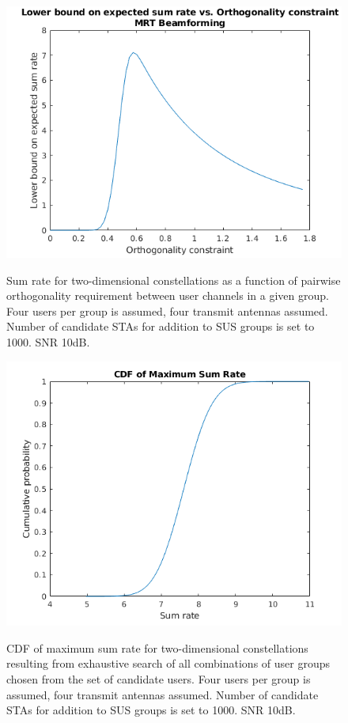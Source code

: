 \begin{figure}
    \centering
    \includegraphics[width=18cm]{figs/1000_candidate_mrt.png}\\
    \caption{Sum rate for two-dimensional constellations as a function of pairwise orthogonality requirement between user channels in a given group. Four users per group is assumed, four transmit antennas assumed. Number of candidate STAs for addition to SUS groups is set to 1000. SNR 10dB.}
    \label{fig:1000_candidate}
\end{figure}

\begin{figure}
    \centering
    \includegraphics[width=18cm]{figs/cdf_4gs_1000cand_1Ptx_0_1Pn.png}\\
    \caption{CDF of maximum sum rate for two-dimensional constellations resulting from exhaustive search of all combinations of user groups chosen from the set of candidate users.  Four users per group is assumed, four transmit antennas assumed. Number of candidate STAs for addition to SUS groups is set to 1000. SNR 10dB.}
    \label{fig:1000_candidate_cdf}
\end{figure}